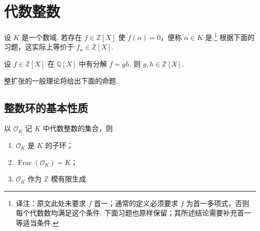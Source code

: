 \section{代数整数}\label{sec:nt-1-2}

设 $K$ 是一个数域. 若存在 $f\in\mathbb{Z}[X]$ 使 $f(\alpha)=0$，便称 $\alpha\in K$ 是.\footnote{译注：原文此处未要求 $f$ 首一；通常的定义必须要求 $f$ 为首一多项式，否则每个代数数均满足这个条件. 下面习题也原样保留；其所述结论需要补充首一等适当条件.} 根据下面的习题，这实际上等价于 $f_\alpha\in\mathbb{Z}[X]$.

\begin{exercise*}

设 $f\in\mathbb{Z}[X]$ 在 $\mathbb{Q}[X]$ 中有分解 $f=gh$. 则 $g,h\in\mathbb{Z}[X]$.

\end{exercise*}

整扩张的一般理论将给出下面的命题.

\subsection{整数环的基本性质}\label{sec:nt-1-2-1}

\begin{proposition*}

以 $\mathcal O_K$ 记 $K$ 中代数整数的集合，则

\begin{enumerate}[label=\roman*)]

\item $\mathcal O_K$ 是 $K$ 的子环；

\item $\operatorname{Frac}(\mathcal O_K)=K$；

\item $\mathcal O_K$ 作为 $\mathbb{Z}$ 模有限生成.

\end{enumerate}

\end{proposition*}


